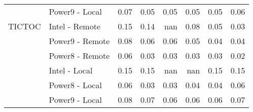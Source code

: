 \begin{tabular}{llrrrrrr}
       & Power9 - Local &   0.07 &   0.05 &   0.05 &   0.05 &   0.05 &   0.06 \\
TICTOC & Intel - Remote &   0.15 &   0.14 &    nan &   0.08 &   0.05 &   0.03 \\
       & Power9 - Remote &   0.08 &   0.06 &   0.06 &   0.05 &   0.04 &   0.04 \\
       & Power8 - Remote &   0.06 &   0.03 &   0.03 &   0.03 &   0.03 &   0.02 \\
       & Intel - Local &   0.15 &   0.15 &    nan &    nan &   0.15 &   0.15 \\
       & Power8 - Local &   0.06 &   0.03 &   0.03 &   0.04 &   0.04 &   0.06 \\
       & Power9 - Local &   0.08 &   0.07 &   0.06 &   0.06 &   0.06 &   0.07 \\
\bottomrule
\end{tabular}
